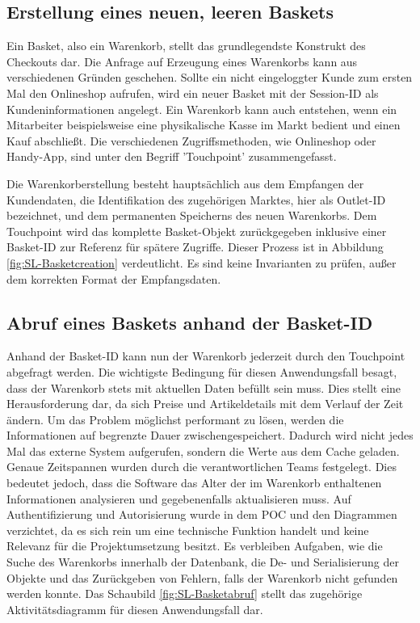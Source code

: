 \subsection{Erstellung eines neuen, leeren Baskets}

Ein Basket, also ein Warenkorb, stellt das grundlegendste Konstrukt des Checkouts dar. Die Anfrage auf Erzeugung eines Warenkorbs kann aus verschiedenen Gründen geschehen. Sollte ein nicht eingeloggter Kunde zum ersten Mal den Onlineshop aufrufen, wird ein neuer Basket mit der Session-ID als Kundeninformationen angelegt. Ein Warenkorb kann auch entstehen, wenn ein Mitarbeiter beispielsweise eine physikalische Kasse im Markt bedient und einen Kauf abschließt. Die verschiedenen Zugriffsmethoden, wie Onlineshop oder Handy-App, sind unter den Begriff 'Touchpoint' zusammengefasst.

Die Warenkorberstellung besteht hauptsächlich aus dem Empfangen der Kundendaten, die Identifikation des zugehörigen Marktes, hier als Outlet-ID bezeichnet, und dem permanenten Speicherns des neuen Warenkorbs. Dem Touchpoint wird das komplette Basket-Objekt zurückgegeben inklusive einer Basket-ID zur Referenz für spätere Zugriffe. Dieser Prozess ist in Abbildung \ref{fig:SL-Basketcreation} verdeutlicht. Es sind keine Invarianten zu prüfen, außer dem korrekten Format der Empfangsdaten.


\subsection{Abruf eines Baskets anhand der Basket-ID}

Anhand der Basket-ID kann nun der Warenkorb jederzeit durch den Touchpoint abgefragt werden. Die wichtigste Bedingung für diesen Anwendungsfall besagt, dass der Warenkorb stets mit aktuellen Daten befüllt sein muss. Dies stellt eine Herausforderung dar, da sich Preise und Artikeldetails mit dem Verlauf der Zeit ändern. Um das Problem möglichst performant zu lösen, werden die Informationen auf begrenzte Dauer zwischengespeichert. Dadurch wird nicht jedes Mal das externe System aufgerufen, sondern die Werte aus dem Cache geladen. Genaue Zeitspannen wurden durch die verantwortlichen Teams festgelegt. Dies bedeutet jedoch, dass die Software das Alter der im Warenkorb enthaltenen Informationen analysieren und gegebenenfalls aktualisieren muss. Auf Authentifizierung und Autorisierung wurde in dem POC und den Diagrammen verzichtet, da es sich rein um eine technische Funktion handelt und keine Relevanz für die Projektumsetzung besitzt. Es verbleiben Aufgaben, wie die Suche des Warenkorbs innerhalb der Datenbank, die De- und Serialisierung der Objekte und das Zurückgeben von Fehlern, falls der Warenkorb nicht gefunden werden konnte. Das Schaubild \ref{fig:SL-Basketabruf} stellt das zugehörige Aktivitätsdiagramm für diesen Anwendungsfall dar.


